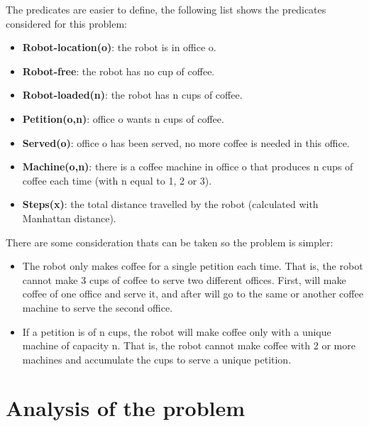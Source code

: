 \documentclass[12pt,a4paper,oneside]{article}
\numberwithin{equation}{section}
\numberwithin{equation}{section}
\theoremstyle{definition}
\begin{document}
The predicates are easier to define, the following list shows the predicates considered for this problem:

\begin{itemize}
	\item \textbf{Robot-location(o)}: the robot is in office o.
	
	\item \textbf{Robot-free}: the robot has no cup of coffee.
	
	\item \textbf{Robot-loaded(n)}: the robot has n cups of coffee.
	
	\item \textbf{Petition(o,n)}: office o wants n cups of coffee.
	
	\item \textbf{Served(o)}: office o has been served, no more coffee is needed in this office.
		
	\item \textbf{Machine(o,n)}: there is a coffee machine in office o that produces n cups of coffee each time (with n equal to 1, 2 or 3).
	
	\item \textbf{Steps(x)}: the total distance travelled by the robot (calculated with Manhattan distance).
		
\end{itemize}

There are some consideration thats can be taken so the problem is simpler:

\begin{itemize}
	\item The robot only makes coffee for a single petition each time. That is, the robot cannot make 3 cups of coffee to serve two different offices. First, will make coffee of one office and serve it, and after will go to the same or another coffee machine to serve the second office.
	
	\item If a petition is of n cups, the robot will make coffee only with a unique machine of capacity n. That is, the robot cannot make coffee with 2 or more machines and accumulate the cups to serve a unique petition.
	
\end{itemize}


\section{Analysis of the problem}
\end{document}

